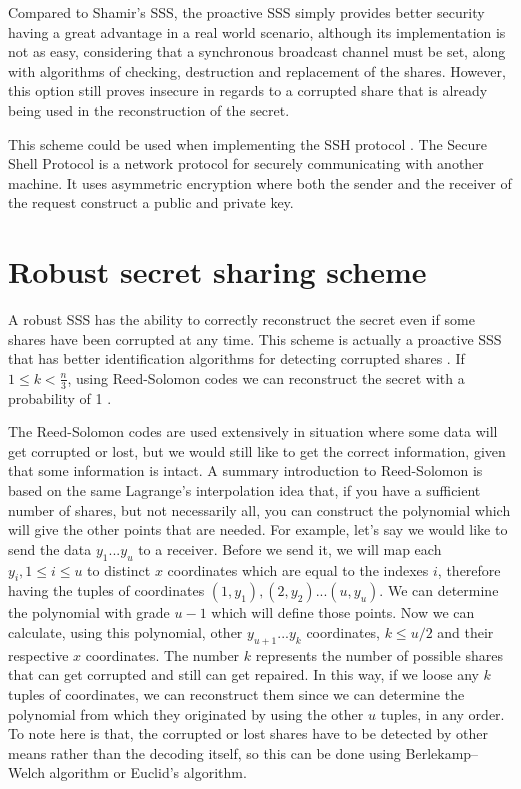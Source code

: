 \documentclass[12pt, a4paper, oneside]{book}
\begin{document}
    Compared to Shamir's SSS, the proactive SSS simply provides better security having a great advantage in a real world scenario, although its implementation is not as easy, considering that a synchronous broadcast channel must be set, along with algorithms of checking, destruction and replacement of the shares. However, this option still proves insecure in regards to a corrupted share that is already being used in the reconstruction of the secret.
    
    This scheme could be used when implementing the SSH protocol \cite{DistiSSH}. The Secure Shell Protocol is a network protocol for securely communicating with another machine. It uses asymmetric encryption where both the sender and the receiver of the request construct a public and private key.
    \section{Robust secret sharing scheme}
    A robust SSS has the ability to correctly reconstruct the secret even if some shares have been corrupted at any time. This scheme is actually a proactive SSS that has better identification algorithms for detecting corrupted shares \cite{PSSS}. 
    If $1{\leq}k{<}\tfrac{n}{3}$, using Reed-Solomon codes we can reconstruct the secret with a probability of 1 \cite{Reed-Solomon}.
    
    The Reed-Solomon codes are used extensively in situation where some data will get corrupted or lost, but we would still like to get the correct information, given that some information is intact. A summary introduction to Reed-Solomon is based on the same Lagrange's interpolation idea that, if you have a sufficient number of shares, but not necessarily all, you can construct the polynomial which will give the other points that are needed. For example, let's say we would like to send the data $ y_1 ... y_u $ to a receiver. Before we send it, we will map each $y_i, 1{\leq}i{\leq}u$ to distinct $x$ coordinates which are equal to the indexes $i$, therefore having the tuples of coordinates $ (1, y_1), (2, y_2) ... (u, y_{u})$. We can determine the polynomial with grade $u-1$ which will define those points. Now we can calculate, using this polynomial, other $y_{u+1} ... y_k$ coordinates, $k{\leq}u/2$ and their respective $x$ coordinates. The number $k$ represents the number of possible shares that can get corrupted and still can get repaired. In this way, if we loose any $k$ tuples of coordinates, we can reconstruct them since we can determine the polynomial from which they originated by using the other $u$ tuples, in any order. To note here is that, the corrupted or lost shares have to be detected by other means rather than the decoding itself, so this can be done using Berlekamp–Welch algorithm \cite{Berlekamp-Welch} or Euclid's algorithm.
    
\end{document}
